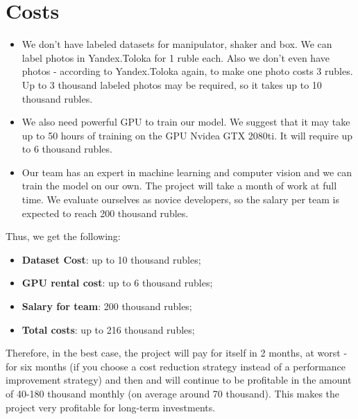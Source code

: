 \section{Costs}

\begin{itemize}

\item We don't have labeled datasets for manipulator, shaker and box. We can label photos in Yandex.Toloka for 1 ruble each. Also we don't even have photos - according to Yandex.Toloka again, to make one photo costs 3 rubles. Up to 3 thousand labeled photos may be required, so it takes up to 10 thousand rubles.

\item We also need powerful GPU to train our model. We suggest that it may take up to 50 hours of training on the GPU Nvidea GTX 2080ti. It will require up to 6 thousand rubles.

\item Our team has an expert in machine learning and computer vision and we can train the model on our own. The project will take a month of work at full time. We evaluate ourselves as novice developers, so the salary per team is expected to reach 200 thousand rubles.
\end{itemize}
Thus, we get the following:
\begin{itemize}
    \item \textbf{Dataset Cost}: up to 10 thousand rubles;
    \item \textbf{GPU rental cost}: up to 6 thousand rubles;
    \item \textbf{Salary for team}: 200 thousand rubles;
    \item \textbf{Total costs}: up to 216 thousand rubles;
\end{itemize}
Therefore, in the best case, the project will pay for itself in 2 months, at worst - for six months (if you choose a cost reduction strategy instead of a performance improvement strategy) and then and will continue to be profitable in the amount of 40-180 thousand monthly (on average around 70 thousand). This makes the project very profitable for long-term investments.
\newline